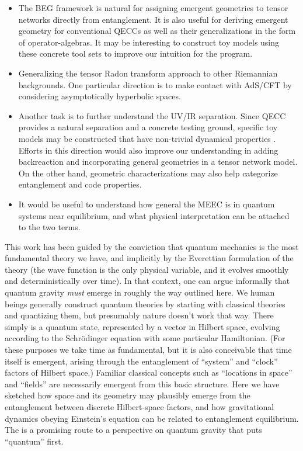 \documentclass[%
preprint,
nofootinbib,
amsmath,amssymb,
aps,
prd,
showpacs,
superscriptaddress
]{revtex4-1}
\begin{document}
\begin{itemize}
	\item The BEG framework is natural for assigning emergent geometries to tensor networks directly from entanglement. It is also useful for deriving emergent geometry for conventional QECCs as well as their generalizations in the form of operator-algebras. It may be interesting to construct toy models using these concrete tool sets to improve our intuition for the program.
	
	\item Generalizing the tensor Radon transform approach to other Riemannian backgrounds. One particular direction is to make contact with AdS/CFT by considering asymptotically hyperbolic spaces. 
	
	\item Another task is to further understand the UV/IR separation. Since QECC provides a natural separation and a concrete testing ground, specific toy models may be constructed that have non-trivial dynamical properties \cite{Osborne:2017woa}. Efforts in this direction would also improve our understanding in adding backreaction and incorporating general geometries in a tensor network model. On the other hand, geometric characterizations may also help categorize entanglement and code properties. 
	
	\item It would be useful to understand how general the MEEC is in quantum systems near equilibrium, and what physical interpretation can be attached to the two terms.
\end{itemize}


This work has been guided by the conviction that quantum mechanics is the most fundamental theory we have, and implicitly by the Everettian formulation of the theory (the wave function is the only physical variable, and it evolves smoothly and deterministically over time).
In that context, one can argue informally that quantum gravity \emph{must} emerge in roughly the way outlined here.
We human beings generally construct quantum theories by starting with classical theories and quantizing them, but presumably nature doesn't work that way.
There simply is a quantum state, represented by a vector in Hilbert space, evolving according to the Schr\"odinger equation with some particular Hamiltonian. (For these purposes we take time as fundamental, but it is also conceivable that time itself is emergent, arising through the entanglement of ``system'' and ``clock'' factors of Hilbert space.)
Familiar classical concepts such as ``locations in space'' and ``fields'' are necessarily emergent from this basic structure.
Here we have sketched how space and its geometry may plausibly emerge from the entanglement between discrete Hilbert-space factors, and how gravitational dynamics obeying Einstein's equation can be related to entanglement equilibrium.
The is a promising route to a perspective on quantum gravity that puts ``quantum'' first.
\end{document}
